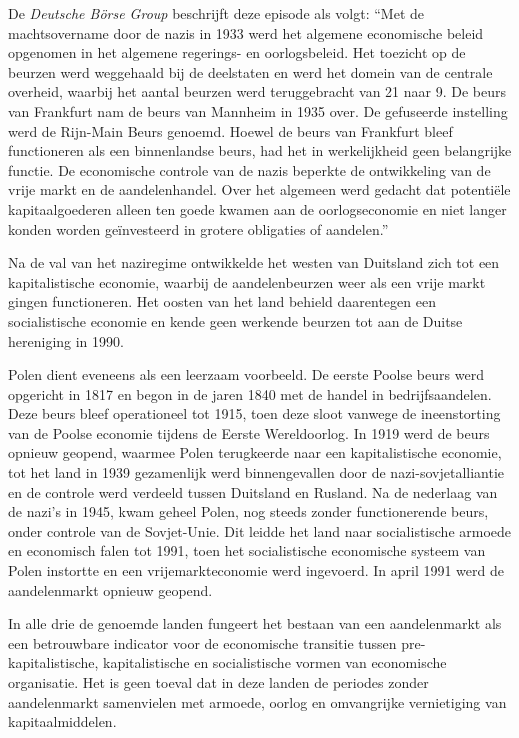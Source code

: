 De \emph{Deutsche Börse Group} beschrijft deze episode als volgt: ``Met de machtsovername door de nazi\textquotesingle s in 1933 werd het algemene economische beleid opgenomen in het algemene regerings- en oorlogsbeleid. Het toezicht op de beurzen werd weggehaald bij de deelstaten en werd het domein van de centrale overheid, waarbij het aantal beurzen werd teruggebracht van 21 naar 9. De beurs van Frankfurt nam de beurs van Mannheim in 1935 over. De gefuseerde instelling werd de Rijn-Main Beurs genoemd. Hoewel de beurs van Frankfurt bleef functioneren als een \textquotesingle binnenlandse beurs\textquotesingle, had het in werkelijkheid geen belangrijke functie. De economische controle van de nazi\textquotesingle s beperkte de ontwikkeling van de vrije markt en de aandelenhandel. Over het algemeen werd gedacht dat potentiële kapitaalgoederen alleen ten goede kwamen aan de oorlogseconomie en niet langer konden worden geïnvesteerd in grotere obligaties of aandelen.''\autocite{132}

Na de val van het naziregime ontwikkelde het westen van Duitsland zich tot een kapitalistische economie, waarbij de aandelenbeurzen weer als een vrije markt gingen functioneren. Het oosten van het land behield daarentegen een socialistische economie en kende geen werkende beurzen tot aan de Duitse hereniging in 1990.

Polen dient eveneens als een leerzaam voorbeeld. De eerste Poolse beurs werd opgericht in 1817 en begon in de jaren 1840 met de handel in bedrijfsaandelen. Deze beurs bleef operationeel tot 1915, toen deze sloot vanwege de ineenstorting van de Poolse economie tijdens de Eerste Wereldoorlog. In 1919 werd de beurs opnieuw geopend, waarmee Polen terugkeerde naar een kapitalistische economie, tot het land in 1939 gezamenlijk werd binnengevallen door de nazi-sovjetalliantie en de controle werd verdeeld tussen Duitsland en Rusland. Na de nederlaag van de nazi's in 1945, kwam geheel Polen, nog steeds zonder functionerende beurs, onder controle van de Sovjet-Unie. Dit leidde het land naar socialistische armoede en economisch falen tot 1991, toen het socialistische economische systeem van Polen instortte en een vrijemarkteconomie werd ingevoerd. In april 1991 werd de aandelenmarkt opnieuw geopend.\autocite{133}

In alle drie de genoemde landen fungeert het bestaan van een aandelenmarkt als een betrouwbare indicator voor de economische transitie tussen pre-kapitalistische, kapitalistische en socialistische vormen van economische organisatie. Het is geen toeval dat in deze landen de periodes zonder aandelenmarkt samenvielen met armoede, oorlog en omvangrijke vernietiging van kapitaalmiddelen.

